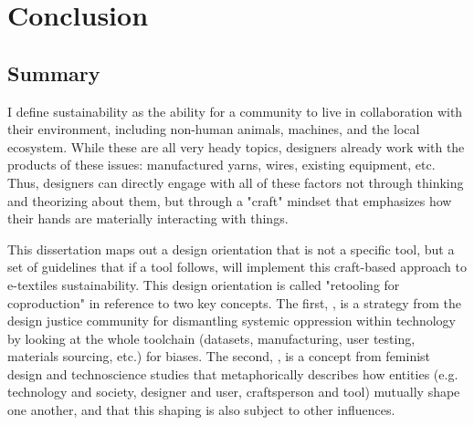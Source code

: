 \chapter{Conclusion}



\section{Summary}


I define sustainability as the ability for a community to live in collaboration with their environment, including non-human animals, machines, and the local ecosystem. While these are all very heady topics, designers already work with the products of these issues: manufactured yarns, wires, existing equipment, etc. Thus, designers can directly engage with all of these factors not through thinking and theorizing about them, but through a "craft" mindset that emphasizes how their hands are materially interacting with things.

This dissertation maps out a design orientation that is not a specific tool, but a set of guidelines that if a tool follows, will implement this craft-based approach to e-textiles sustainability. 
This design orientation is called "retooling for coproduction" in reference to two key concepts. The first, , is a strategy from the design justice community for dismantling systemic oppression within technology by looking at the whole toolchain (datasets, manufacturing, user testing, materials sourcing, etc.) for biases. The second, , is a concept from feminist design and technoscience studies that metaphorically describes how entities (e.g. technology and society, designer and user, craftsperson and tool) mutually shape one another, and that this shaping is also subject to other influences. 

